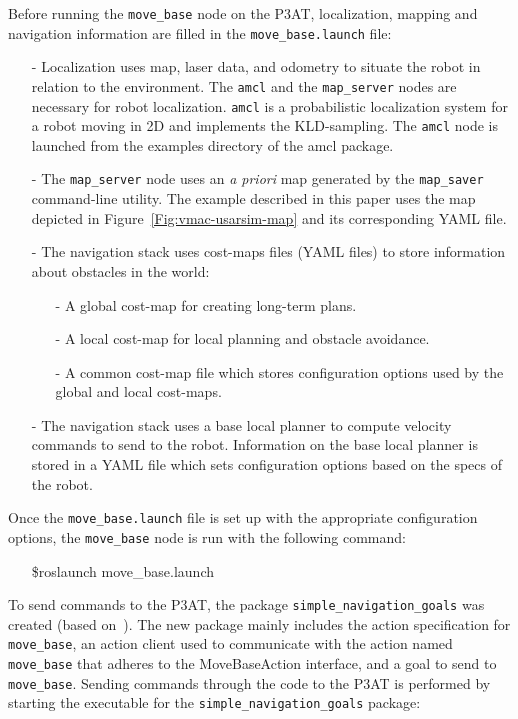 Before running the \texttt{move\_base} node on the P3AT, localization, mapping and navigation information are filled in the \texttt{move\_base.launch} file:
\begin{itemize}
 \item [-] Localization uses map, laser data, and odometry to situate the robot in relation to the environment. The \texttt{amcl} and the \texttt{map\_server} nodes are necessary for robot localization. \texttt{amcl} is a probabilistic localization system for a robot moving in 2D and implements the KLD-sampling\cite{DIETER.IJRS.2003}. The \texttt{amcl} node is launched from the examples directory of the amcl package.
\item [-] The \texttt{map\_server} node uses an {\it a priori} map generated by the \texttt{map\_saver} command-line utility. The example described in this paper uses the map depicted in Figure~\ref{Fig:vmac-usarsim-map} and its corresponding YAML file.
\item [-] The navigation stack uses cost-maps files (YAML files) to store information about obstacles in the world:
\begin{itemize}
\item [-] A global cost-map for creating long-term plans.
\item [-] A local cost-map for local planning and obstacle avoidance.
\item [-] A common cost-map file which stores configuration options used by the global and local cost-maps.
\end{itemize}
\item [-] The navigation stack uses a base local planner to compute velocity commands to send to the robot. Information on the base local planner is stored in a YAML file which sets configuration options based on the specs of the robot.
\end{itemize}

Once the \texttt{move\_base.launch} file is set up with the appropriate configuration options, the \texttt{move\_base} node is run with the following command:

\begin{itemize}
\item[]\$roslaunch move\_base.launch
\end{itemize}

To send commands to the P3AT, the package \texttt{simple\_navigation\_goals} was created (based on~\cite{SendingSimpleGoals}). The new package mainly includes the action specification for \texttt{move\_base},  an action client used to communicate with the action named \texttt{move\_base} that adheres to the MoveBaseAction interface, and a goal to send to \texttt{move\_base}. Sending commands through the code to the P3AT is performed by starting the executable for the \texttt{simple\_navigation\_goals} package:

